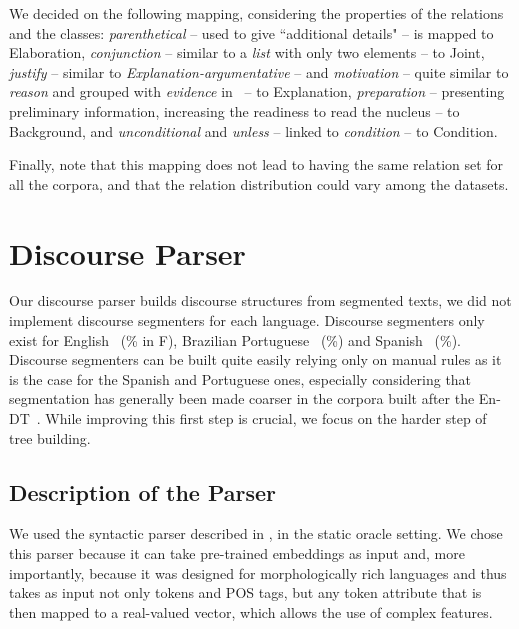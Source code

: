 \documentclass[11pt]{article}
\newcommand{\enrst}{En-DT}
\newcommand{\rel}[1]{\textit{#1}}
\newcommand{\crel}[1]{{\sc #1}\xspace}
\begin{document}
We decided on the following mapping, considering the properties of the relations and the classes: \rel{parenthetical} -- used to give ``additional details" -- is mapped to \crel{Elaboration}, 
\rel{conjunction} -- similar to a \rel{list} with only two elements -- to \crel{Joint}, 
\rel{justify} -- similar to \rel{Explanation-argumentative} -- and \rel{motivation} -- quite similar to \rel{reason} and grouped with \rel{evidence} in~\cite{benamara:mapping:2015} -- to \crel{Explanation},  
\rel{preparation} -- presenting preliminary information, increasing the readiness to read the nucleus -- to \crel{Background}, 
and \rel{unconditional} and \rel{unless} -- linked to \rel{condition} -- to \crel{Condition}.

Finally, note that this mapping does not lead to having the same relation set for all the corpora, and that the relation distribution could vary among the datasets.


\section{Discourse Parser}
\label{sec:parser}


Our discourse parser builds discourse structures from segmented texts, we did not implement discourse segmenters for each language. Discourse segmenters only exist for English~\cite{duverle:hilda:2010} (\% in F), Brazilian Portuguese~\cite{pardo:development:2008} (\%) and Spanish~\cite{dacunha:diseg:2010,cunha:diseg:2012} (\%). Discourse segmenters can be built quite easily relying only on manual rules as it is the case for the Spanish and Portuguese ones, especially considering that segmentation has generally been made coarser in the corpora built after the \enrst~\cite{vliet:building:2011}. While improving this first step is crucial, we focus on the harder step of tree building. 

\subsection{Description of the Parser}

We used the syntactic parser described in , in the static oracle setting.
We chose this parser because it can take pre-trained embeddings as input and, more importantly,
because it was designed for morphologically rich languages and thus takes as input not only tokens and POS tags,
but any token attribute that is then mapped to a real-valued vector, which allows the use of complex features.
\end{document}
